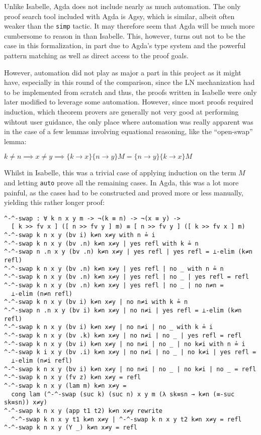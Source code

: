 \documentclass[a4paper, 12pt, twoside]{style/ociamthesis}
\theoremstyle{plain}
\theoremstyle{definition}
\newtheorem{Lemma}{Lemma}[chapter]
\theoremstyle{remark}
\renewenvironment{Lemma}{\begin{OldLemma}\begin{mdframed}[style=example, linecolor=cyan]}{\end{mdframed}\end{OldLemma}}
\begin{document}
Unlike Isabelle, Agda does not include nearly as much automation. The
only proof search tool included with Agda is Agsy, which is similar,
albeit often weaker than the \texttt{simp} tactic. It may therefore seem
that Agda will be much more cumbersome to reason in than Isabelle. This,
however, turns out not to be the case in this formalization, in part due
to Agda's type system and the powerful pattern matching as well as
direct access to the proof goals.

However, automation did not play as major a part in this project as it
might have, especially in this round of the comparison, since the LN
mechanization had to be implemented from scratch and thus, the proofs
written in Isabelle were only later modified to leverage some
automation. However, since most proofs required induction, which theorem
provers are generally not very good at performing wihtout user guidance,
the only place where automation was really apparent was in the case of a
few lemmas involving equational reasoning, like the ``open-swap'' lemma:

\begin{Lemma}

\label{Lemma:opnSwap}
\(k \neq n \implies x \neq y \implies \{k \to x\}\{n \to y\}M = \{n \to y\}\{k \to x\}M\)

\end{Lemma}

Whilst in Isabelle, this was a trivial case of applying induction on the
term \(M\) and letting \texttt{auto} prove all the remaining cases. In
Agda, this was a lot more painful, as the cases had to be constructed
and proved more or less manually, yielding this rather longer proof:

\begin{verbatim}
^-^-swap : ∀ k n x y m -> ¬(k ≡ n) -> ¬(x ≡ y) -> 
  [ k >> fv x ] ([ n >> fv y ] m) ≡ [ n >> fv y ] ([ k >> fv x ] m)
^-^-swap k n x y (bv i) k≠n x≠y with n ≟ i
^-^-swap k n x y (bv .n) k≠n x≠y | yes refl with k ≟ n
^-^-swap n .n x y (bv .n) k≠n x≠y | yes refl | yes refl = ⊥-elim (k≠n refl)
^-^-swap k n x y (bv .n) k≠n x≠y | yes refl | no _ with n ≟ n
^-^-swap k n x y (bv .n) k≠n x≠y | yes refl | no _ | yes refl = refl
^-^-swap k n x y (bv .n) k≠n x≠y | yes refl | no _ | no n≠n = 
  ⊥-elim (n≠n refl)
^-^-swap k n x y (bv i) k≠n x≠y | no n≠i with k ≟ n
^-^-swap n .n x y (bv i) k≠n x≠y | no n≠i | yes refl = ⊥-elim (k≠n refl)
^-^-swap k n x y (bv i) k≠n x≠y | no n≠i | no _ with k ≟ i
^-^-swap k n x y (bv .k) k≠n x≠y | no n≠i | no _ | yes refl = refl
^-^-swap k n x y (bv i) k≠n x≠y | no n≠i | no _ | no k≠i with n ≟ i
^-^-swap k i x y (bv .i) k≠n x≠y | no n≠i | no _ | no k≠i | yes refl = 
  ⊥-elim (n≠i refl)
^-^-swap k n x y (bv i) k≠n x≠y | no n≠i | no _ | no k≠i | no _ = refl
^-^-swap k n x y (fv z) k≠n x≠y = refl
^-^-swap k n x y (lam m) k≠n x≠y = 
  cong lam (^-^-swap (suc k) (suc n) x y m (λ sk≡sn → k≠n (≡-suc sk≡sn)) x≠y)
^-^-swap k n x y (app t1 t2) k≠n x≠y rewrite
  ^-^-swap k n x y t1 k≠n x≠y | ^-^-swap k n x y t2 k≠n x≠y = refl
^-^-swap k n x y (Y _) k≠n x≠y = refl
\end{verbatim}
\end{document}
